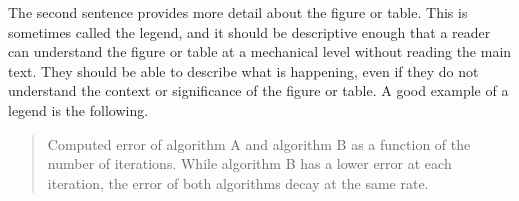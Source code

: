 \documentclass[]{article}
\begin{document}
The second sentence provides more detail about the figure or table. This is sometimes called the legend, and it should be descriptive enough that a reader can understand the figure or table at a mechanical level without reading the main text. They should be able to describe what is happening, even if they do not understand the context or significance of the figure or table. A good example of a legend is the following.
\begin{quote}
    Computed error of algorithm A and algorithm B as a function of the number of iterations. While algorithm B has a lower error at each iteration, the error of both algorithms decay at the same rate.
\end{quote}
\end{document}
